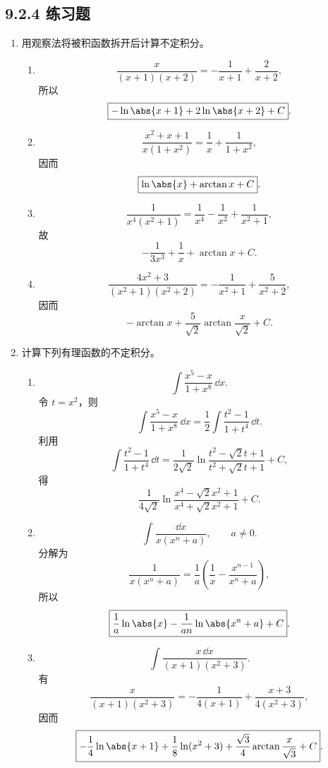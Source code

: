 \subsection*{9.2.4 练习题}

\begin{enumerate}
  \item 用观察法将被积函数拆开后计算不定积分。
  \begin{enumerate}[label=(\arabic*)]
    \item
    \[
      \frac{x}{(x+1)(x+2)}=-\frac1{x+1}+\frac2{x+2},
    \]
    所以
    \[
      \boxed{-\ln\abs{x+1}+2\ln\abs{x+2}+C}.
    \]

    \item
    \[
      \frac{x^2+x+1}{x(1+x^2)}=\frac1x+\frac1{1+x^2},
    \]
    因而
    \[
      \boxed{\ln\abs{x}+\arctan x+C}.
    \]

    \item
    \[
      \frac1{x^4(x^2+1)}=\frac1{x^4}-\frac1{x^2}+\frac1{x^2+1},
    \]
    故
    \[
      \boxed{-\frac1{3x^3}+\frac1x+\arctan x+C}.
    \]

    \item
    \[
      \frac{4x^2+3}{(x^2+1)(x^2+2)}
      =-\frac1{x^2+1}+\frac5{x^2+2},
    \]
    因而
    \[
      \boxed{-\arctan x+\frac5{\sqrt2}\arctan\frac{x}{\sqrt2}+C}.
    \]
  \end{enumerate}

  \item 计算下列有理函数的不定积分。
  \begin{enumerate}[label=(\arabic*)]
    \item
    \[
      \int\frac{x^5-x}{1+x^8}\,\dd x.
    \]
    令 $t=x^2$，则
    \[
      \int\frac{x^5-x}{1+x^8}\,\dd x
      =\frac12\int\frac{t^2-1}{1+t^4}\,\dd t.
    \]
    利用
    \[
      \int\frac{t^2-1}{1+t^4}\,\dd t
      =\frac1{2\sqrt2}
       \ln\frac{t^2-\sqrt2t+1}{t^2+\sqrt2t+1}+C,
    \]
    得
    \[
      \boxed{
      \frac1{4\sqrt2}
      \ln\frac{x^4-\sqrt2x^2+1}{x^4+\sqrt2x^2+1}+C}.
    \]

    \item
    \[
      \int\frac{\dd x}{x(x^n+a)},\qquad a\ne0.
    \]
    分解为
    \[
      \frac1{x(x^n+a)}
      =\frac1a\left(\frac1x-\frac{x^{n-1}}{x^n+a}\right),
    \]
    所以
    \[
      \boxed{
      \frac1a\ln\abs{x}-\frac1{an}\ln\abs{x^n+a}+C}.
    \]

    \item
    \[
      \int\frac{x\,\dd x}{(x+1)(x^2+3)}.
    \]
    有
    \[
      \frac{x}{(x+1)(x^2+3)}
      =-\frac1{4(x+1)}+\frac{x+3}{4(x^2+3)},
    \]
    因而
    \[
      \boxed{-\frac14\ln\abs{x+1}
      +\frac18\ln(x^2+3)
      +\frac{\sqrt3}{4}\arctan\frac{x}{\sqrt3}+C}.
    \]


\end{enumerate}
\end{enumerate}
